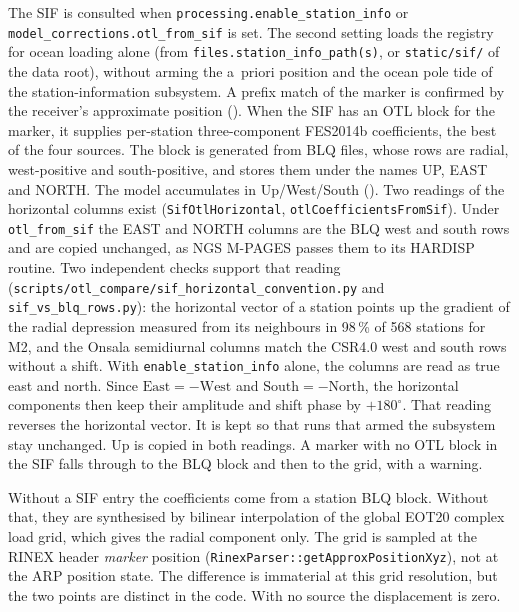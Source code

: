 \documentclass[main.tex]{subfiles}
\begin{document}
The SIF is consulted when \texttt{processing.enable\_station\_info} or
\texttt{model\_corrections.otl\_from\_sif} is set.  The second setting
loads the registry for ocean loading alone (from
\texttt{files.station\_info\_path(s)}, or \texttt{static/sif/} of the data
root), without arming the a~priori position and the ocean pole tide of the
station-information subsystem.  A prefix match of the marker is confirmed
by the receiver's approximate position
().  When the SIF has an OTL block for the marker, it supplies
per-station three-component FES2014b coefficients, the best of the four
sources.  The block is generated from BLQ files, whose rows are radial,
west-positive and south-positive, and stores them under the names UP,
EAST and NORTH.  The model accumulates in Up/West/South
().  Two readings of the horizontal columns exist
(\texttt{SifOtlHorizontal}, \texttt{otlCoefficientsFromSif}).  Under
\texttt{otl\_from\_sif} the EAST and NORTH columns are the BLQ west and
south rows and are copied unchanged, as NGS M-PAGES passes them to its
HARDISP routine.  Two independent checks support that reading
(\texttt{scripts/otl\_compare/sif\_horizontal\_convention.py} and
\texttt{sif\_vs\_blq\_rows.py}): the horizontal vector of a station points
up the gradient of the radial depression measured from its neighbours in
98\,\% of 568 stations for M2, and the Onsala semidiurnal columns match
the CSR4.0 west and south rows without a shift.  With
\texttt{enable\_station\_info} alone, the columns are read as true east
and north.  Since $\text{East}=-\text{West}$ and
$\text{South}=-\text{North}$, the horizontal components then keep their
amplitude and shift phase by $+180^\circ$.  That reading reverses the
horizontal vector.  It is kept so that runs that armed the subsystem stay
unchanged.  Up is copied in both readings.  A marker with no OTL block in
the SIF falls through to the BLQ block and then to the grid, with a
warning.

Without a SIF entry the coefficients come from a station BLQ block.
Without that, they are synthesised by bilinear interpolation of the
global EOT20 complex load grid, which gives the radial component only.
The grid is sampled at the RINEX header \emph{marker} position
(\texttt{RinexParser::getApproxPositionXyz}), not at the ARP position
state.  The difference is immaterial at this grid resolution, but the
two points are distinct in the code.  With no source the displacement is
zero.
\end{document}
